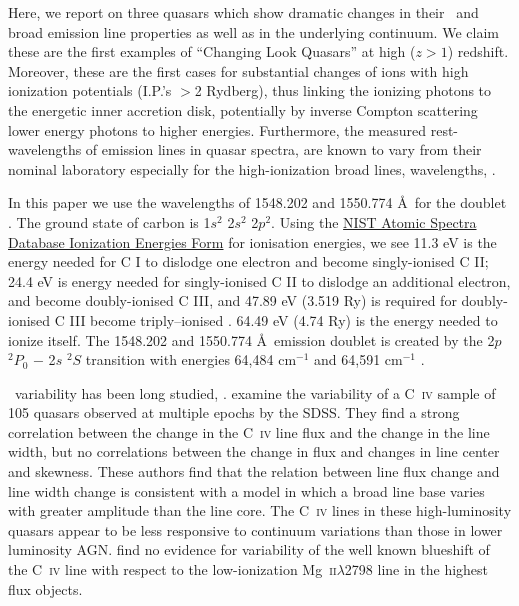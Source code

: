 \documentclass[a4paper,fleqn,usenatbib]{mnras}
\begin{document}
Here, we report on three quasars  
which show dramatic changes in their \civ\ and \ciii broad emission
line properties as well as in the underlying continuum. We claim these
are the first examples of ``Changing Look Quasars'' at high ($z>1$)
redshift. Moreover, these are the first cases for substantial changes
of ions with high ionization potentials (I.P.'s $>$2 Rydberg), thus
linking the ionizing photons to the energetic inner accretion disk,
potentially by inverse Compton scattering lower energy photons to
higher energies.  Furthermore, the measured rest-wavelengths of
emission lines in quasar spectra, are known to vary from their nominal
laboratory especially for the high-ionization broad lines,
wavelengths, \citep[e.g.][]{VandenBerk2001}.

In this paper we use the wavelengths of 1548.202 and 1550.774 \AA\ for the \civ doublet \citep{Kramida2018}. The ground state of carbon is 1$s^2$ 2$s^2$ 2$p^2$.  Using the \href{https://physics.nist.gov/PhysRefData/ASD/ionEnergy.html}{NIST Atomic Spectra Database Ionization Energies Form} for ionisation energies, we see 11.3 eV is the energy needed for C I to dislodge one electron and become singly-ionised C II; 24.4 eV is energy needed for singly-ionised C II to dislodge an additional electron, and become doubly-ionised C III, and 47.89 eV (3.519 Ry) is required for doubly-ionised C III become triply--ionised \civ.  64.49 eV (4.74 Ry) is the energy needed to ionize \civ itself. The 1548.202 and 1550.774 \AA\ emission doublet is created by the 2$p$ $^{2}P_{0}$ $-$ 2$s$ $^{2}S$ transition with energies 64,484 cm$^{-1}$ and 64,591 cm$^{-1}$ \citep[e.g.][]{Moore1993}.
 
\civ\ variability has been long studied, \citep[e.g., ][]{Baldwin1977,
Gaskell1982, Gregory1982, Wilkes1986, Espey1989, Espey1990Erratum,
ZhengSulentic1990, Corbin1990, Corbin1991, Weymann1991,
Dimitrijevic1992, TytlerFan1992, Wills1993, Brotherton1994, Osmer1994,
Laor1995, McIntosh1999, Nazarova2003}.
\citet{Wilhite2006} examine the variability of a C~\textsc{iv} sample
of 105 quasars observed at multiple epochs by the SDSS.  They find a
strong correlation between the change in the C~\textsc{iv} line flux
and the change in the line width, but no correlations between the
change in flux and changes in line center and skewness.  These authors
find that the relation between line flux change and line width change
is consistent with a model in which a broad line base varies with
greater amplitude than the line core. The C~\textsc{iv} lines in these
high-luminosity quasars appear to be less responsive to continuum
variations than those in lower luminosity AGN.  \citet{Wilhite2006}
find no evidence for variability of the well known blueshift of the
C~\textsc{iv} line with respect to the low-ionization
Mg~\textsc{ii}$\lambda$2798 line in the highest flux objects. 
\end{document}
